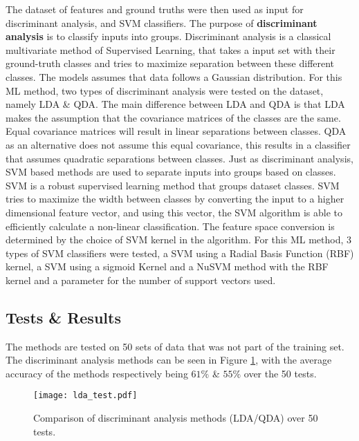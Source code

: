 \documentclass[../main.tex]{subfiles}
\begin{document}
The dataset of features and ground truths were then used as input for discriminant analysis, and SVM classifiers.
The purpose of \textbf{discriminant analysis} is to classify inputs into groups.
Discriminant analysis is a classical multivariate method of Supervised Learning, that takes a input set with their ground-truth classes and tries to maximize separation between these different classes.
The models assumes that data follows a Gaussian distribution. 
For this ML method, two types of discriminant analysis were tested on the dataset, namely LDA \& \gls{QDA}.
The main difference between LDA and QDA is that LDA makes the assumption that the covariance matrices of the classes are the same.
Equal covariance matrices will result in linear separations between classes.
QDA as an alternative does not assume this equal covariance, this results in a classifier that assumes quadratic separations between classes.
Just as discriminant analysis, SVM based methods are used to separate inputs into groups based on classes.
SVM is a robust supervised learning method that groups dataset classes.
SVM tries to maximize the width between classes by converting the input to a higher dimensional feature vector, and using this vector, the SVM algorithm is able to efficiently calculate a non-linear classification.
The feature space conversion is determined by the choice of SVM kernel in the algorithm.
For this ML method, 3 types of SVM classifiers were tested, a SVM using a Radial Basis Function (RBF) kernel, a SVM using a sigmoid Kernel and a NuSVM method with the RBF kernel and a parameter for the number of support vectors used.

\subsection{Tests \& Results}

The methods are tested on 50 sets of data that was not part of the training set.
The discriminant analysis methods can be seen in Figure \ref{fig:lda_test}, with the average accuracy of the methods respectively being $61\%$ \& $55\%$ over the 50 tests.

\begin{figure}[H]
\begin{center}
\texttt{[image: lda\_test.pdf]}
\caption{Comparison of discriminant analysis methods (\gls{LDA}/\gls{QDA}) over 50 tests.}
\label{fig:lda_test}
\end{center}
\end{figure}
\end{document}
